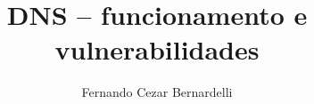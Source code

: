 \newcommand{\monog}{%
DNS -- funcionamento e vulnerabilidades
}
\title{\monog}
\newcommand{\por}{%
Fernando Cezar Bernardelli
}
\author{\por}

\newcommand{\univ}{Universidade Federal do Paraná}
\newcommand{\facu}{}
\newcommand{\curs}{Bacharelado em Ciência da Computação}
\newcommand{\degree}{Bacharel}
\newcommand{\prof}{Dr. Luiz Carlos Pessoa Albini}
